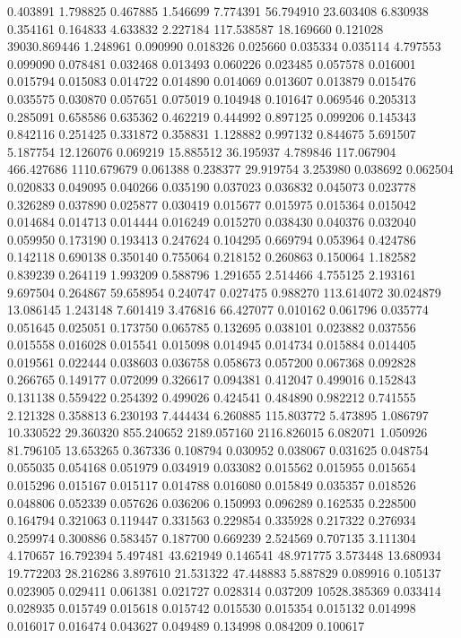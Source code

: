 0.403891
1.798825
0.467885
1.546699
7.774391
56.794910
23.603408
6.830938
0.354161
0.164833
4.633832
2.227184
117.538587
18.169660
0.121028
39030.869446
1.248961
0.090990
0.018326
0.025660
0.035334
0.035114
4.797553
0.099090
0.078481
0.032468
0.013493
0.060226
0.023485
0.057578
0.016001
0.015794
0.015083
0.014722
0.014890
0.014069
0.013607
0.013879
0.015476
0.035575
0.030870
0.057651
0.075019
0.104948
0.101647
0.069546
0.205313
0.285091
0.658586
0.635362
0.462219
0.444992
0.897125
0.099206
0.145343
0.842116
0.251425
0.331872
0.358831
1.128882
0.997132
0.844675
5.691507
5.187754
12.126076
0.069219
15.885512
36.195937
4.789846
117.067904
466.427686
1110.679679
0.061388
0.238377
29.919754
3.253980
0.038692
0.062504
0.020833
0.049095
0.040266
0.035190
0.037023
0.036832
0.045073
0.023778
0.326289
0.037890
0.025877
0.030419
0.015677
0.015975
0.015364
0.015042
0.014684
0.014713
0.014444
0.016249
0.015270
0.038430
0.040376
0.032040
0.059950
0.173190
0.193413
0.247624
0.104295
0.669794
0.053964
0.424786
0.142118
0.690138
0.350140
0.755064
0.218152
0.260863
0.150064
1.182582
0.839239
0.264119
1.993209
0.588796
1.291655
2.514466
4.755125
2.193161
9.697504
0.264867
59.658954
0.240747
0.027475
0.988270
113.614072
30.024879
13.086145
1.243148
7.601419
3.476816
66.427077
0.010162
0.061796
0.035774
0.051645
0.025051
0.173750
0.065785
0.132695
0.038101
0.023882
0.037556
0.015558
0.016028
0.015541
0.015098
0.014945
0.014734
0.015884
0.014405
0.019561
0.022444
0.038603
0.036758
0.058673
0.057200
0.067368
0.092828
0.266765
0.149177
0.072099
0.326617
0.094381
0.412047
0.499016
0.152843
0.131138
0.559422
0.254392
0.499026
0.424541
0.484890
0.982212
0.741555
2.121328
0.358813
6.230193
7.444434
6.260885
115.803772
5.473895
1.086797
10.330522
29.360320
855.240652
2189.057160
2116.826015
6.082071
1.050926
81.796105
13.653265
0.367336
0.108794
0.030952
0.038067
0.031625
0.048754
0.055035
0.054168
0.051979
0.034919
0.033082
0.015562
0.015955
0.015654
0.015296
0.015167
0.015117
0.014788
0.016080
0.015849
0.035357
0.018526
0.048806
0.052339
0.057626
0.036206
0.150993
0.096289
0.162535
0.228500
0.164794
0.321063
0.119447
0.331563
0.229854
0.335928
0.217322
0.276934
0.259974
0.300886
0.583457
0.187700
0.669239
2.524569
0.707135
3.111304
4.170657
16.792394
5.497481
43.621949
0.146541
48.971775
3.573448
13.680934
19.772203
28.216286
3.897610
21.531322
47.448883
5.887829
0.089916
0.105137
0.023905
0.029411
0.061381
0.021727
0.028314
0.037209
10528.385369
0.033414
0.028935
0.015749
0.015618
0.015742
0.015530
0.015354
0.015132
0.014998
0.016017
0.016474
0.043627
0.049489
0.134998
0.084209
0.100617
